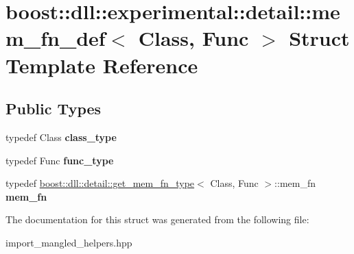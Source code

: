 \hypertarget{a00219}{}\section{boost\+:\+:dll\+:\+:experimental\+:\+:detail\+:\+:mem\+\_\+fn\+\_\+def$<$ Class, Func $>$ Struct Template Reference}
\label{a00219}
\subsection*{Public Types}
\begin{DoxyCompactItemize}
\item 
typedef Class {\bfseries class\+\_\+type}\hypertarget{a00219_a85c2e551e2b989cce1ec657f886e3caf}{}\label{a00219_a85c2e551e2b989cce1ec657f886e3caf}

\item 
typedef Func {\bfseries func\+\_\+type}\hypertarget{a00219_ae168f1c659ea8b1e71c05132393a0e35}{}\label{a00219_ae168f1c659ea8b1e71c05132393a0e35}

\item 
typedef \hyperlink{a00131}{boost\+::dll\+::detail\+::get\+\_\+mem\+\_\+fn\+\_\+type}$<$ Class, Func $>$\+::mem\+\_\+fn {\bfseries mem\+\_\+fn}\hypertarget{a00219_aab11eba8545f0b80ba59091743cb8774}{}\label{a00219_aab11eba8545f0b80ba59091743cb8774}

\end{DoxyCompactItemize}


The documentation for this struct was generated from the following file\+:\begin{DoxyCompactItemize}
\item 
import\+\_\+mangled\+\_\+helpers.\+hpp\end{DoxyCompactItemize}
